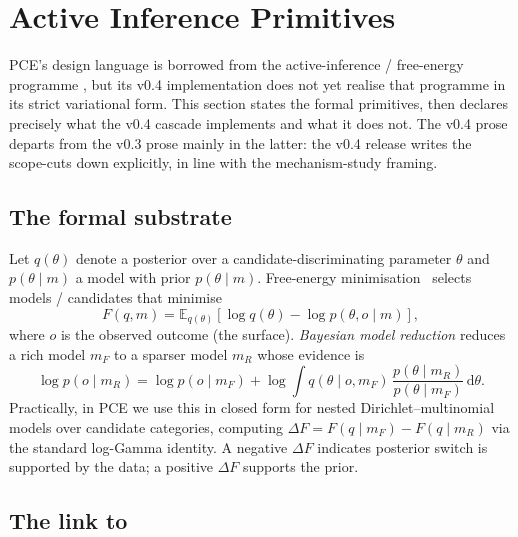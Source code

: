 \section{Active Inference Primitives}\label{sec:active_inference_background}

PCE's design language is borrowed from the active-inference / free-energy programme \citep{Friston2010FreeEnergyUnifiedBrainTheory,Friston2017ActiveInferenceCuriosity}, but its v0.4 implementation does not yet realise that programme in its strict variational form. This section states the formal primitives, then declares precisely what the v0.4 cascade implements and what it does not. The v0.4 prose departs from the v0.3 prose mainly in the latter: the v0.4 release writes the scope-cuts down explicitly, in line with the mechanism-study framing.

\subsection{The formal substrate}

Let $q(\theta)$ denote a posterior over a candidate-discriminating parameter $\theta$ and $p(\theta\mid m)$ a model with prior $p(\theta\mid m)$. Free-energy minimisation~\citep{Friston2017ActiveInferenceCuriosity,Friston2010FreeEnergyUnifiedBrainTheory} selects models / candidates that minimise
\begin{equation}
F(q,m) = \mathbb{E}_{q(\theta)}\!\left[\log q(\theta) - \log p(\theta, o\mid m)\right],
\end{equation}
where $o$ is the observed outcome (the surface). \emph{Bayesian model reduction} \citep{FristonPenny2011,Friston2018BayesianModelReductionArxiv,FristonEtAl2016BayesianModelReductionEmpiricalBayesDCM} reduces a rich model $m_F$ to a sparser model $m_R$ whose evidence is
\begin{equation}
\log p(o\mid m_R) = \log p(o\mid m_F) + \log \int q(\theta\mid o, m_F)\,\frac{p(\theta\mid m_R)}{p(\theta\mid m_F)} \,\mathrm{d}\theta.
\end{equation}
Practically, in PCE we use this in closed form for nested Dirichlet--multinomial models over candidate categories, computing $\Delta F = F(q\mid m_F) - F(q\mid m_R)$ via the standard log-Gamma identity. A negative $\Delta F$ indicates posterior switch is supported by the data; a positive $\Delta F$ supports the prior.

\subsection{The link to }

